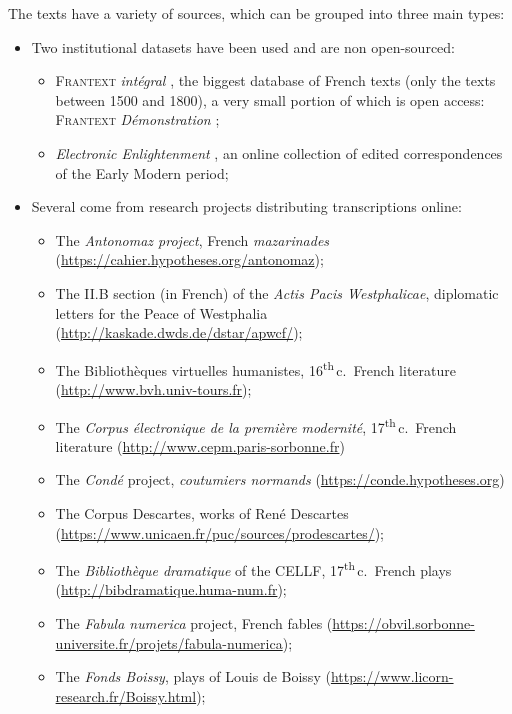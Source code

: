 The texts have a variety of sources, which can be grouped into three main types:
\begin{itemize}
    \item Two institutional datasets have been used and are non open-sourced:
          \begin{itemize}
              \item \textsc{Frantext} \emph{intégral} \citep{atilf-1998-frantext}, the biggest database of French texts (only the texts between 1500 and 1800), a very small portion of which is open access: \textsc{Frantext} \emph{Démonstration} \citep{atilf-1998-frantext-d};
              \item \emph{Electronic Enlightenment} \citep{bodleian-2008-electronic}, an online collection of edited correspondences of the Early Modern period;
          \end{itemize}
    \item Several come from research projects distributing transcriptions online:
          \begin{itemize}
              \item The \emph{Antonomaz project},  French \emph{mazarinades} (\url{https://cahier.hypotheses.org/antonomaz});
              \item The II.B section (in French) of the \emph{Actis Pacis Westphalicae}, diplomatic letters for the Peace of Westphalia (\url{http://kaskade.dwds.de/dstar/apwcf/});
              \item The Bibliothèques virtuelles humanistes, 16\textsuperscript{th}\,c.~French literature (\url{http://www.bvh.univ-tours.fr});
              \item The \emph{Corpus électronique de la première modernité}, 17\textsuperscript{th}\,c.~French literature (\url{http://www.cepm.paris-sorbonne.fr})
              \item The \emph{Condé} project, \emph{coutumiers normands} (\url{https://conde.hypotheses.org})
              \item The Corpus Descartes, works of René Descartes (\url{https://www.unicaen.fr/puc/sources/prodescartes/});
              \item The \emph{Bibliothèque dramatique} of the CELLF, 17\textsuperscript{th}\,c.~French plays (\url{http://bibdramatique.huma-num.fr});
              \item The \emph{Fabula numerica} project, French fables (\url{https://obvil.sorbonne-universite.fr/projets/fabula-numerica});
              \item The \emph{ Fonds Boissy}, plays of Louis de Boissy (\url{https://www.licorn-research.fr/Boissy.html});

\end{itemize}
\end{itemize}

